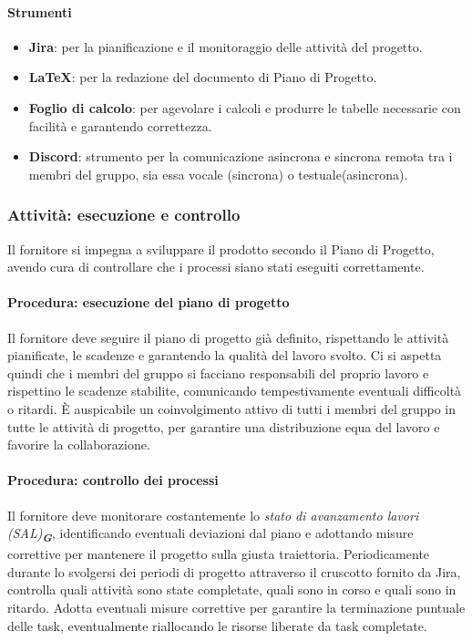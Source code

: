 \documentclass[a4paper,12pt]{article}
\newcommand{\glossario}[1]{\textit{#1}\textsubscript{\textbf{\textit{\textcolor{lightblack}{G}}}}}
\begin{document}
\paragraph{Strumenti}
\begin{itemize}
    \item \textbf{Jira}: per la pianificazione e il monitoraggio delle attività del progetto.
    \item \textbf{\LaTeX}: per la redazione del documento di Piano di Progetto.
    \item \textbf{Foglio di calcolo}: per agevolare i calcoli e produrre le tabelle necessarie con facilità e garantendo correttezza.
    \item \textbf{Discord}: strumento per la comunicazione asincrona e sincrona remota tra i membri del gruppo, sia essa vocale (sincrona) o testuale(asincrona).
\end{itemize}

\subsubsection{Attività: esecuzione e controllo}
Il fornitore si impegna a sviluppare il prodotto secondo il Piano di Progetto,
avendo cura di controllare che i processi siano stati eseguiti correttamente.

\paragraph{Procedura: esecuzione del piano di progetto}
Il fornitore deve seguire il piano di progetto già definito, rispettando le
attività pianificate, le scadenze e garantendo la qualità del lavoro svolto. Ci
si aspetta quindi che i membri del gruppo si facciano responsabili del proprio
lavoro e rispettino le scadenze stabilite, comunicando tempestivamente
eventuali difficoltà o ritardi. È auspicabile un coinvolgimento attivo di tutti
i membri del gruppo in tutte le attività di progetto, per garantire una
distribuzione equa del lavoro e favorire la collaborazione.

\paragraph{Procedura: controllo dei processi}
Il fornitore deve monitorare costantemente lo \glossario{stato di avanzamento
    lavori (SAL)}, identificando eventuali deviazioni dal piano e adottando misure
correttive per mantenere il progetto sulla giusta traiettoria. Periodicamente
durante lo svolgersi dei periodi di progetto attraverso il cruscotto fornito
da Jira, controlla quali attività sono state completate, quali sono in corso e
quali sono in ritardo. Adotta eventuali misure correttive per garantire la
terminazione puntuale delle task, eventualmente riallocando le risorse liberate
da task completate.
\end{document}
